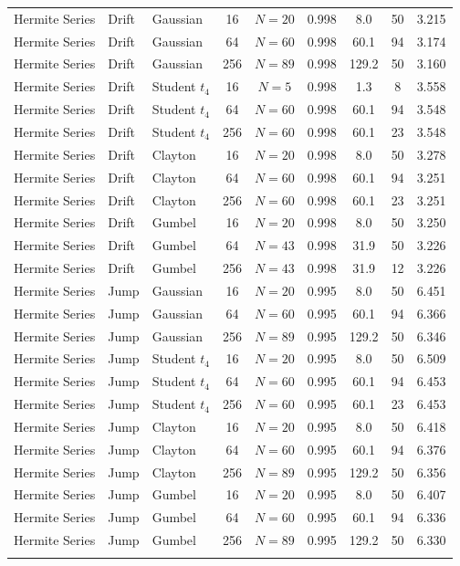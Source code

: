 \begin{longtable}{@{}lllcccccc@{}}
\addlinespace
Hermite Series & Drift & Gaussian & 16 & $N=20$ & 0.998 & 8.0 & 50 & 3.215 \\
Hermite Series & Drift & Gaussian & 64 & $N=60$ & 0.998 & 60.1 & 94 & 3.174 \\
Hermite Series & Drift & Gaussian & 256 & $N=89$ & 0.998 & 129.2 & 50 & 3.160 \\
Hermite Series & Drift & Student $t_4$ & 16 & $N=5$ & 0.998 & 1.3 & 8 & 3.558 \\
Hermite Series & Drift & Student $t_4$ & 64 & $N=60$ & 0.998 & 60.1 & 94 & 3.548 \\
Hermite Series & Drift & Student $t_4$ & 256 & $N=60$ & 0.998 & 60.1 & 23 & 3.548 \\
Hermite Series & Drift & Clayton & 16 & $N=20$ & 0.998 & 8.0 & 50 & 3.278 \\
Hermite Series & Drift & Clayton & 64 & $N=60$ & 0.998 & 60.1 & 94 & 3.251 \\
Hermite Series & Drift & Clayton & 256 & $N=60$ & 0.998 & 60.1 & 23 & 3.251 \\
Hermite Series & Drift & Gumbel & 16 & $N=20$ & 0.998 & 8.0 & 50 & 3.250 \\
Hermite Series & Drift & Gumbel & 64 & $N=43$ & 0.998 & 31.9 & 50 & 3.226 \\
Hermite Series & Drift & Gumbel & 256 & $N=43$ & 0.998 & 31.9 & 12 & 3.226 \\
\addlinespace
Hermite Series & Jump & Gaussian & 16 & $N=20$ & 0.995 & 8.0 & 50 & 6.451 \\
Hermite Series & Jump & Gaussian & 64 & $N=60$ & 0.995 & 60.1 & 94 & 6.366 \\
Hermite Series & Jump & Gaussian & 256 & $N=89$ & 0.995 & 129.2 & 50 & 6.346 \\
Hermite Series & Jump & Student $t_4$ & 16 & $N=20$ & 0.995 & 8.0 & 50 & 6.509 \\
Hermite Series & Jump & Student $t_4$ & 64 & $N=60$ & 0.995 & 60.1 & 94 & 6.453 \\
Hermite Series & Jump & Student $t_4$ & 256 & $N=60$ & 0.995 & 60.1 & 23 & 6.453 \\
Hermite Series & Jump & Clayton & 16 & $N=20$ & 0.995 & 8.0 & 50 & 6.418 \\
Hermite Series & Jump & Clayton & 64 & $N=60$ & 0.995 & 60.1 & 94 & 6.376 \\
Hermite Series & Jump & Clayton & 256 & $N=89$ & 0.995 & 129.2 & 50 & 6.356 \\
Hermite Series & Jump & Gumbel & 16 & $N=20$ & 0.995 & 8.0 & 50 & 6.407 \\
Hermite Series & Jump & Gumbel & 64 & $N=60$ & 0.995 & 60.1 & 94 & 6.336 \\
Hermite Series & Jump & Gumbel & 256 & $N=89$ & 0.995 & 129.2 & 50 & 6.330 \\
\addlinespace
\end{longtable}
